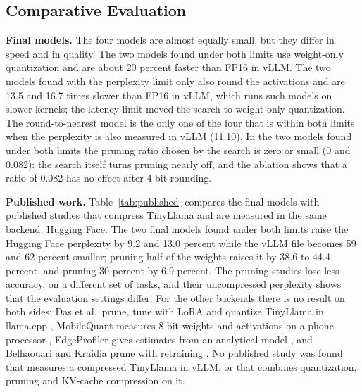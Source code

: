 \documentclass[num-refs]{wiley-article}
\begin{document}
\subsection{Comparative Evaluation}

\textbf{Final models.} The four models are almost equally small, but they differ in speed and in quality. The two models found under both limits use weight-only quantization and are about 20 percent faster than FP16 in vLLM. The two models found with the perplexity limit only also round the activations and are 13.5 and 16.7 times slower than FP16 in vLLM, which runs such models on slower kernels; the latency limit moved the search to weight-only quantization. The round-to-nearest model is the only one of the four that is within both limits when the perplexity is also measured in vLLM (11.10). In the two models found under both limits the pruning ratio chosen by the search is zero or small (0 and 0.082): the search itself turns pruning nearly off, and the ablation shows that a ratio of 0.082 has no effect after 4-bit rounding.

\textbf{Published work.} Table~\ref{tab:published} compares the final models with published studies that compress TinyLlama and are measured in the same backend, Hugging Face. The two final models found under both limits raise the Hugging Face perplexity by 9.2 and 13.0 percent while the vLLM file becomes 59 and 62 percent smaller; pruning half of the weights raises it by 38.6 to 44.4 percent, and pruning 30 percent by 6.9 percent. The pruning studies lose less accuracy, on a different set of tasks, and their uncompressed perplexity shows that the evaluation settings differ. For the other backends there is no result on both sides: Das et al.\ prune, tune with LoRA and quantize TinyLlama in llama.cpp \cite{das2026largemodels}, MobileQuant measures 8-bit weights and activations on a phone processor \cite{tan2024mobilequant}, EdgeProfiler gives estimates from an analytical model \cite{pinnock2025edgeprofiler}, and Belhaouari and Kraidia prune with retraining \cite{belhaouari2025smartpruning}. No published study was found that measures a compressed TinyLlama in vLLM, or that combines quantization, pruning and KV-cache compression on it.
\end{document}
